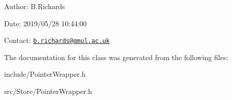 \begin{DoxyParagraph}{Author\-:}
B.\-Richards 
\end{DoxyParagraph}
\begin{DoxyParagraph}{Date\-:}
2019/05/28 10\-:44\-:00 
\end{DoxyParagraph}
Contact\-: \href{mailto:b.richards@qmul.ac.uk}{\tt b.\-richards@qmul.\-ac.\-uk} 

The documentation for this class was generated from the following files\-:\begin{DoxyCompactItemize}
\item 
include/Pointer\-Wrapper.\-h\item 
src/\-Store/Pointer\-Wrapper.\-h\end{DoxyCompactItemize}
